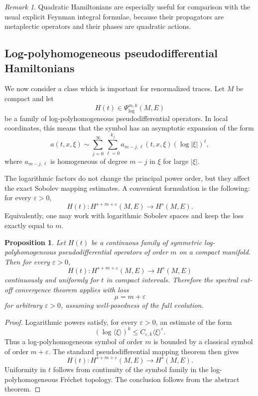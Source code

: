 \documentclass[11pt]{amsart}
\theoremstyle{plain}
\newtheorem{proposition}[theorem]{Proposition}
\theoremstyle{definition}
\theoremstyle{remark}
\newtheorem{remark}[theorem]{Remark}
\begin{document}
\begin{remark}
Quadratic Hamiltonians are especially useful for comparison with the
usual explicit Feynman integral formulae, because their propagators are
metaplectic operators and their phases are quadratic actions.
\end{remark}

\subsection{Log-polyhomogeneous pseudodifferential Hamiltonians}

We now consider a class which is important for renormalized traces.
Let \(M\) be compact and let
\[
        H(t)\in \Psi_{\log}^{m,k}(M,E)
\]
be a family of log-polyhomogeneous pseudodifferential operators.  In
local coordinates, this means that the symbol has an asymptotic
expansion of the form
\[
        a(t,x,\xi)
        \sim
        \sum_{j=0}^{\infty}
        \sum_{\ell=0}^{k_j}
        a_{m-j,\ell}(t,x,\xi)(\log|\xi|)^\ell,
\]
where \(a_{m-j,\ell}\) is homogeneous of degree \(m-j\) in \(\xi\) for
large \(|\xi|\).

The logarithmic factors do not change the principal power order, but
they affect the exact Sobolev mapping estimates.  A convenient
formulation is the following: for every \(\varepsilon>0\),
\[
        H(t):H^{s+m+\varepsilon}(M,E)\to H^s(M,E).
\]
Equivalently, one may work with logarithmic Sobolev spaces and keep the
loss exactly equal to \(m\).

\begin{proposition}
Let \(H(t)\) be a continuous family of symmetric log-polyhomogeneous
pseudodifferential operators of order \(m\) on a compact manifold.  Then
for every \(\varepsilon>0\),
\[
        H(t):H^{s+m+\varepsilon}(M,E)\to H^s(M,E)
\]
continuously and uniformly for \(t\) in compact intervals.  Therefore
the spectral cut-off convergence theorem applies with loss
\[
        \mu=m+\varepsilon
\]
for arbitrary \(\varepsilon>0\), assuming well-posedness of the full
evolution.
\end{proposition}

\begin{proof}
Logarithmic powers satisfy, for every \(\varepsilon>0\), an estimate of
the form
\[
        (\log\langle \xi\rangle)^k
        \leq
        C_{\varepsilon,k}\langle \xi\rangle^\varepsilon.
\]
Thus a log-polyhomogeneous symbol of order \(m\) is bounded by a
classical symbol of order \(m+\varepsilon\).  The standard
pseudodifferential mapping theorem then gives
\[
        H(t):H^{s+m+\varepsilon}(M,E)\to H^s(M,E).
\]
Uniformity in \(t\) follows from continuity of the symbol family in the
log-polyhomogeneous Fréchet topology.  The conclusion follows from the
abstract theorem.
\end{proof}
\end{document}
